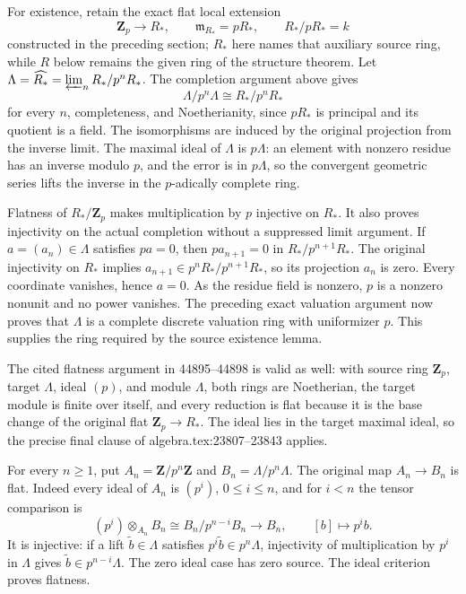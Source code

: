 For existence, retain the exact flat local extension \[
 \mathbf Z_p\longrightarrow R_*,\qquad
 \mathfrak m_{R_*}=pR_*,\qquad R_*/pR_*=k
\] constructed in the preceding section; \(R_*\) here names that auxiliary source ring, while \(R\) below remains the given ring of the structure theorem. Let \(\Lambda=\widehat{R_*}=\varprojlim_n R_*/p^nR_*\). The completion argument above gives \[
 \Lambda/p^n\Lambda\cong R_*/p^nR_*
\] for every \(n\), completeness, and Noetherianity, since \(pR_*\) is principal and its quotient is a field. The isomorphisms are induced by the original projection from the inverse limit. The maximal ideal of \(\Lambda\) is \(p\Lambda\): an element with nonzero residue has an inverse modulo \(p\), and the error is in \(p\Lambda\), so the convergent geometric series lifts the inverse in the \(p\)-adically complete ring.

Flatness of \(R_*/\mathbf Z_p\) makes multiplication by \(p\) injective on \(R_*\). It also proves injectivity on the actual completion without a suppressed limit argument. If \(a=(a_n)\in\Lambda\) satisfies \(pa=0\), then \(pa_{n+1}=0\) in \(R_*/p^{n+1}R_*\). The original injectivity on \(R_*\) implies \(a_{n+1}\in p^nR_*/p^{n+1}R_*\), so its projection \(a_n\) is zero. Every coordinate vanishes, hence \(a=0\). As the residue field is nonzero, \(p\) is a nonzero nonunit and no power vanishes. The preceding exact valuation argument now proves that \(\Lambda\) is a complete discrete valuation ring with uniformizer \(p\). This supplies the ring required by the source existence lemma.

The cited flatness argument in 44895--44898 is valid as well: with source ring \(\mathbf Z_p\), target \(\Lambda\), ideal \((p)\), and module \(\Lambda\), both rings are Noetherian, the target module is finite over itself, and every reduction is flat because it is the base change of the original flat \(\mathbf Z_p\to R_*\). The ideal lies in the target maximal ideal, so the precise final clause of algebra.\AlgebraIdentifierBreak{}tex:\AlgebraIdentifierBreak{}23807--\AlgebraIdentifierBreak{}23843 applies.

For every \(n\geq1\), put \(A_n=\mathbf Z/p^n\mathbf Z\) and \(B_n=\Lambda/p^n\Lambda\). The original map \(A_n\to B_n\) is flat. Indeed every ideal of \(A_n\) is \((p^i)\), \(0\leq i\leq n\), and for \(i<n\) the tensor comparison is \[
 (p^i)\otimes_{A_n}B_n
   \cong B_n/p^{n-i}B_n
   \longrightarrow B_n,\qquad [b]\longmapsto p^ib.
\] It is injective: if a lift \(\widetilde b\in\Lambda\) satisfies \(p^i\widetilde b\in p^n\Lambda\), injectivity of multiplication by \(p^i\) in \(\Lambda\) gives \(\widetilde b\in p^{n-i}\Lambda\). The zero ideal case has zero source. The ideal criterion proves flatness.

